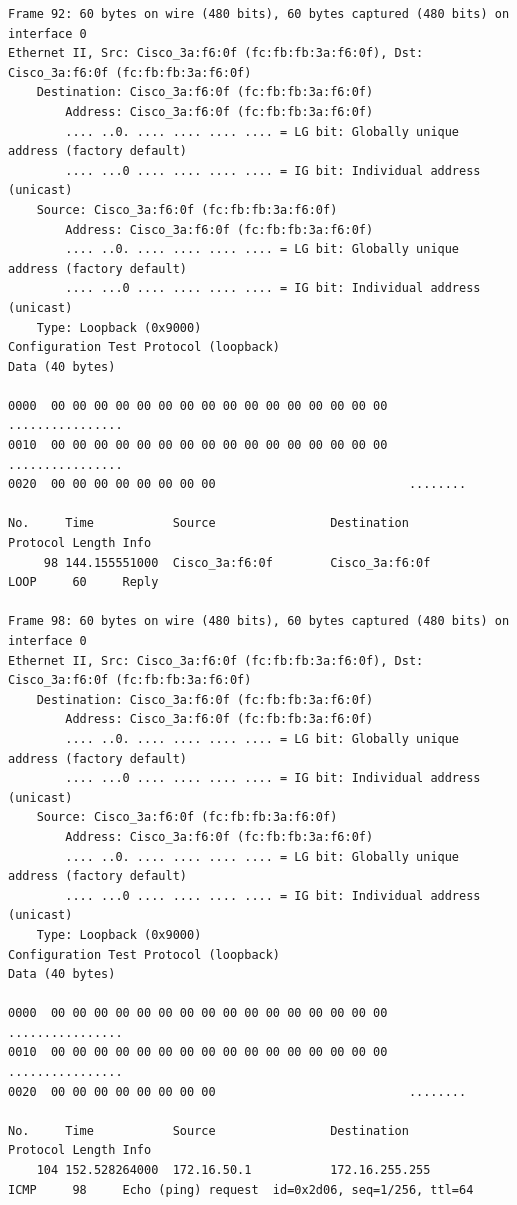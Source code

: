 \documentclass[a4paper,11pt]{article}
\begin{document}
\begin{lstlisting}
Frame 92: 60 bytes on wire (480 bits), 60 bytes captured (480 bits) on interface 0
Ethernet II, Src: Cisco_3a:f6:0f (fc:fb:fb:3a:f6:0f), Dst: Cisco_3a:f6:0f (fc:fb:fb:3a:f6:0f)
    Destination: Cisco_3a:f6:0f (fc:fb:fb:3a:f6:0f)
        Address: Cisco_3a:f6:0f (fc:fb:fb:3a:f6:0f)
        .... ..0. .... .... .... .... = LG bit: Globally unique address (factory default)
        .... ...0 .... .... .... .... = IG bit: Individual address (unicast)
    Source: Cisco_3a:f6:0f (fc:fb:fb:3a:f6:0f)
        Address: Cisco_3a:f6:0f (fc:fb:fb:3a:f6:0f)
        .... ..0. .... .... .... .... = LG bit: Globally unique address (factory default)
        .... ...0 .... .... .... .... = IG bit: Individual address (unicast)
    Type: Loopback (0x9000)
Configuration Test Protocol (loopback)
Data (40 bytes)

0000  00 00 00 00 00 00 00 00 00 00 00 00 00 00 00 00   ................
0010  00 00 00 00 00 00 00 00 00 00 00 00 00 00 00 00   ................
0020  00 00 00 00 00 00 00 00                           ........

No.     Time           Source                Destination           Protocol Length Info
     98 144.155551000  Cisco_3a:f6:0f        Cisco_3a:f6:0f        LOOP     60     Reply

Frame 98: 60 bytes on wire (480 bits), 60 bytes captured (480 bits) on interface 0
Ethernet II, Src: Cisco_3a:f6:0f (fc:fb:fb:3a:f6:0f), Dst: Cisco_3a:f6:0f (fc:fb:fb:3a:f6:0f)
    Destination: Cisco_3a:f6:0f (fc:fb:fb:3a:f6:0f)
        Address: Cisco_3a:f6:0f (fc:fb:fb:3a:f6:0f)
        .... ..0. .... .... .... .... = LG bit: Globally unique address (factory default)
        .... ...0 .... .... .... .... = IG bit: Individual address (unicast)
    Source: Cisco_3a:f6:0f (fc:fb:fb:3a:f6:0f)
        Address: Cisco_3a:f6:0f (fc:fb:fb:3a:f6:0f)
        .... ..0. .... .... .... .... = LG bit: Globally unique address (factory default)
        .... ...0 .... .... .... .... = IG bit: Individual address (unicast)
    Type: Loopback (0x9000)
Configuration Test Protocol (loopback)
Data (40 bytes)

0000  00 00 00 00 00 00 00 00 00 00 00 00 00 00 00 00   ................
0010  00 00 00 00 00 00 00 00 00 00 00 00 00 00 00 00   ................
0020  00 00 00 00 00 00 00 00                           ........

No.     Time           Source                Destination           Protocol Length Info
    104 152.528264000  172.16.50.1           172.16.255.255        ICMP     98     Echo (ping) request  id=0x2d06, seq=1/256, ttl=64


\end{lstlisting}
\end{document}
